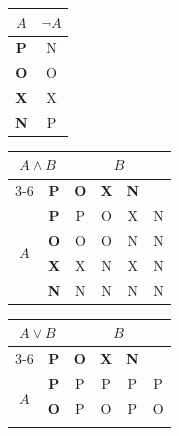 \documentclass[a4paper, 11pt]{article}
\begin{document}
\bigskip
\begin{table}[h]
    \centering
    \begin{tabular}[p]{|c|c|}
        \hline
        $A$        & $\neg A$ \\
        \hline
        \textbf{P} & N        \\
        \textbf{O} & O        \\
        \textbf{X} & X        \\
        \textbf{N} & P        \\
        \hline
    \end{tabular}
    \begin{tabular}[p]{|c|c|c|c|c|c|}
        \hline
        \multicolumn{2}{|c|}{\multirow{2}{*}{$A \wedge B$}} & \multicolumn{4}{c|}{$B$}                                            \\ \cline{3-6}
        \multicolumn{2}{| c |}{}                            & \textbf{P}               & \textbf{O} & \textbf{X} & \textbf{N}     \\ \hline
        \multirow{4}{*}{$A$}                                & \textbf{P}               & P          & O          & X          & N \\ \cline{2-6}
                                                            & \textbf{O}               & O          & O          & N          & N \\ \cline{2-6}
                                                            & \textbf{X}               & X          & N          & X          & N \\ \cline{2-6}
                                                            & \textbf{N}               & N          & N          & N          & N \\ \hline
    \end{tabular}
    \begin{tabular}[p]{|c|c|c|c|c|c|}
        \hline
        \multicolumn{2}{|c|}{\multirow{2}{*}{$A \vee B$}} & \multicolumn{4}{c|}{$B$}                                            \\\cline{3-6}
        \multicolumn{2}{| c |}{}                          & \textbf{P}               & \textbf{O} & \textbf{X} & \textbf{N}     \\ \hline
        \multirow{4}{*}{$A$}                              & \textbf{P}               & P          & P          & P          & P \\ \cline{2-6}
                                                          & \textbf{O}               & P          & O          & P          & O \\ \cline{2-6}

\end{tabular}
\end{table}
\end{document}

